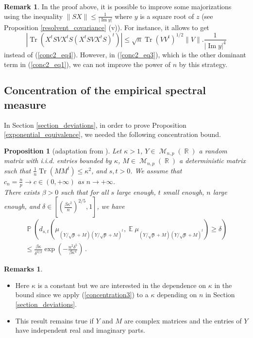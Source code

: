 \documentclass[11pt,a4paper]{article}
\DeclareMathOperator{\E}{\mathbb{E}}
\DeclareMathOperator{\R}{\mathbb{R}}
\DeclareMathOperator{\PR}{\mathbb{P}}
\DeclareMathOperator{\MM}{\mathcal{M}}
\DeclareMathOperator{\1}{\mathbf{1}}
\DeclareMathOperator{\Imag}{\mathrm{Im}}
\DeclareMathOperator{\Tr}{\mathrm{Tr}}
\newtheorem{Proposition}{Proposition}[section]
\theoremstyle{definition}
\newtheorem*{Remark}{Remark}
\newtheorem*{Remarks}{Remarks}
\begin{document}
\begin{Remark}
In the proof above, it is possible to improve some majorizations using the inequality $\|SX\| \le \frac{1}{|\Imag y|}$ where $y$ is a square root of $z$ (see Proposition \ref{resolvent_covariance} (v)). For instance, it allows to get
\begin{displaymath}
|\Tr(X^tSVX^tS(X^tSVX^tS)^t)| \le \sqrt{n} \Tr(VV^t)^{1/2} \|V\| . \frac{1}{|\Imag y|^4}
\end{displaymath}
instead of (\ref{conc2_eq4}). However, in (\ref{conc2_eq3}), which is the other dominant term in (\ref{conc2_eq1}), we can not improve the power of $n$ by this strategy.
\end{Remark}




\subsection{Concentration of the empirical spectral measure}

In Section \ref{section_deviations}, in order to prove Proposition \ref{exponential_equivalence}, we needed the following concentration bound.

\begin{Proposition}[adaptation from {\cite[Theorem 2.5]{BC}}]
Let $\kappa>1$, $Y \in \MM_{n,p}(\R)$ a random matrix with i.i.d. entries bounded by $\kappa$, $M \in \MM_{n,p}(\R)$ a deterministic matrix such that $\frac1n \Tr(MM^t) \le \kappa^2$, and $s,t>0$. We assume that $c_n = \frac{n}{p} \to c \in (0,+\infty)$ as $n \to +\infty$.\\
There exists $\beta>0$ such that for all $s$ large enough, $t$ small enough, $n$ large enough, and $\delta \in \left[ \left( \frac{\beta\kappa^2}{n} \right)^{2/5} , 1 \right]$, we have
\begin{multline} \label{concentration3}
\PR \left( d_{s,t} \left( \mu_{(Y/\sqrt{p}+M)(Y/\sqrt{p}+M)^t} , \E \mu_{(Y/\sqrt{p}+M)(Y/\sqrt{p}+M)^t} \right) \ge \delta \right) \\
\le \frac{\beta\kappa}{\delta^{3/2}} \exp \left( -\frac{n^2\delta^5}{\beta\kappa^4} \right) \, .
\end{multline}
\end{Proposition}

\begin{Remarks}
\begin{itemize}
\item Here $\kappa$ is a constant but we are interested in the dependence on $\kappa$ in the bound since we apply (\ref{concentration3}) to a $\kappa$ depending on $n$ in Section \ref{section_deviations}.
\item This result remains true if $Y$ and $M$ are complex matrices and the entries of $Y$ have independent real and imaginary parts.
\end{itemize}
\end{Remarks}
\end{document}
